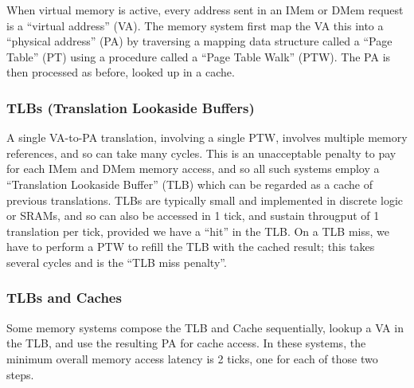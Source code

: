 

When virtual memory is active, every address sent in an IMem or DMem
request is a ``virtual address'' (VA).  The memory system first map
the VA this into a ``physical address'' (PA) by traversing a mapping
data structure called a ``Page Table'' (PT) using a procedure called a
``Page Table Walk'' (PTW).  The PA is then processed as before, {\ie}
looked up in a cache.


\subsubsection{TLBs (Translation Lookaside Buffers)}


A single VA-to-PA translation, involving a single PTW, involves
multiple memory references, and so can take many cycles.  This is an
unacceptable penalty to pay for each IMem and DMem memory access, and
so all such systems employ a ``Translation Lookaside Buffer'' (TLB)
which can be regarded as a cache of previous translations.  TLBs are
typically small and implemented in discrete logic or SRAMs, and so can
also be accessed in 1 tick, and sustain througput of 1 translation per
tick, provided we have a ``hit'' in the TLB.  On a TLB miss, we have
to perform a PTW to refill the TLB with the cached result; this takes
several cycles and is the ``TLB miss penalty''.


\subsubsection{TLBs and Caches}

Some memory systems compose the TLB and Cache sequentially, {\ie}
lookup a VA in the TLB, and use the resulting PA for cache access.
In these systems, the minimum overall memory access latency is 2 ticks,
one for each of those two steps.



